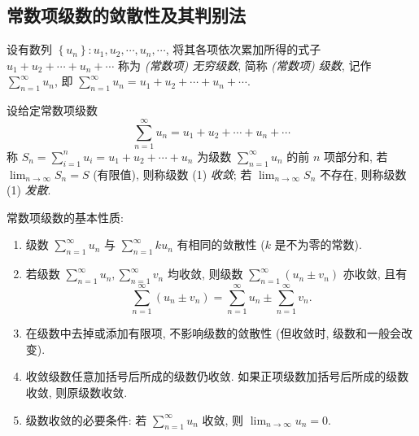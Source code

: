 \subsection{常数项级数的敛散性及其判别法}

\begin{definition}[常数项级数]
    设有数列 $ \left\{u_{n}\right\}: u_{1}, u_{2}, \cdots, u_{n}, \cdots $, 将其各项依次累加所得的式子 $ u_{1}+u_{2}+\cdots+u_{n}+\cdots$ 称为 \textit{(常数项) 无穷级数}, 简称 \textit{(常数项) 级数}, 记作 $\displaystyle \sum_{n=1}^{\infty} u_{n} $, 即 $\displaystyle \sum_{n=1}^{\infty} u_{n}=u_{1}+u_{2}+\cdots+   u_{n}+\cdots .$
\end{definition}

\begin{definition}[常数项级数收敛]
    设给定常数项级数
    \begin{equation}
        \sum_{n=1}^{\infty} u_{n}=u_{1}+u_{2}+\cdots+u_{n}+\cdots
        \tag{1}
    \end{equation}
    称 $\displaystyle S_{n}=\sum_{i=1}^{n} u_{i}=u_{1}+u_{2}+\cdots+u_{n} $ 为级数 $\displaystyle \sum_{n=1}^{\infty} u_{n} $ 的前 $ n $ 项部分和, 若 $\displaystyle \lim _{n \to \infty} S_{n}=S $ (有限值), 则称级数 (1) \textit{收敛}; 若 $\displaystyle \lim _{n \to \infty} S_{n} $ 不存在, 则称级数 (1) \textit{发散}.
\end{definition}

常数项级数的基本性质:
\begin{enumerate}[label=(\arabic{*})]
    \item 级数 $\displaystyle \sum_{n=1}^{\infty} u_{n} $ 与 $\displaystyle \sum_{n=1}^{\infty} k u_{n} $ 有相同的敛散性 ($k $ 是不为零的常数).
    \item 若级数 $\displaystyle \sum_{n=1}^{\infty} u_{n}, \sum_{n=1}^{\infty} v_{n} $ 均收敛, 则级数 $\displaystyle \sum_{n=1}^{\infty}\left(u_{n} \pm v_{n}\right) $ 亦收敛, 且有
          $$\sum_{n=1}^{\infty}\left(u_{n} \pm v_{n}\right)=\sum_{n=1}^{\infty} u_{n} \pm \sum_{n=1}^{\infty} v_{n} .$$
    \item 在级数中去掉或添加有限项, 不影响级数的敛散性 (但收敛时, 级数和一般会改变).
    \item 收敛级数任意加括号后所成的级数仍收敛. 如果正项级数加括号后所成的级数收敛, 则原级数收敛.
    \item 级数收敛的必要条件: 若 $\displaystyle \sum_{n=1}^{\infty} u_{n} $ 收敛, 则 $\displaystyle \lim _{n \to \infty} u_{n}=0 $.
\end{enumerate}

